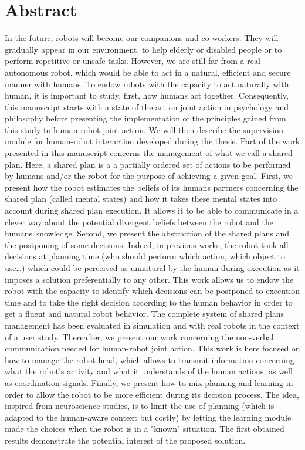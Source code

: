 \documentclass[english,a4paper,11pt,twoside]{StyleThese}
\begin{document}
\dominitoc
\faketableofcontents
\fi


\chapter*{Abstract}

In the future, robots will become our companions and co-workers. They will gradually appear in our environment, to help elderly or disabled people or to perform repetitive or unsafe tasks. However, we are still far from a real autonomous robot, which would be able to act in a natural, efficient and secure manner with humans. 
To endow robots with the capacity to act naturally with human, it is important to study, first, how humans act together. Consequently, this manuscript starts with a state of the art on joint action in psychology and philosophy before presenting the implementation of the principles gained from this study to human-robot joint action. We will then describe the supervision module for human-robot interaction developed during the thesis.
Part of the work presented in this manuscript concerns the management of what we call a shared plan. Here, a shared plan is a a partially ordered set of actions to be performed by humans and/or the robot for the purpose of achieving a given goal. First, we present how the robot estimates the beliefs of its humans partners  concerning the shared plan (called mental states) and how it takes these mental states into account during shared plan execution. It allows it to be able to communicate in a clever way about the potential divergent beliefs between the robot and the humans knowledge. Second, we present the abstraction of the shared plans and the postponing of some decisions. Indeed, in previous works, the robot took all decisions at planning time (who should perform which action, which object to use…) which could be perceived as unnatural by the human during execution as it imposes a solution preferentially to any other. This work allows us to endow the robot with the capacity to identify which decisions can be postponed to execution time and to take the right decision according to the human behavior in order to get a fluent and natural robot behavior. The complete system of shared plans management has been evaluated in simulation  and  with real robots in the context of a user study.
Thereafter, we present our work concerning the non-verbal communication needed for human-robot joint action. This work is here focused on how to manage the robot head, which allows to transmit information concerning what the robot's activity and what it understands of the human actions, as well as coordination signals.
Finally, we present how to mix planning and learning in order to allow the robot to be more efficient during its decision process. The idea, inspired from neuroscience studies, is to limit the use of planning (which is adapted to the human-aware context but costly) by letting the learning module made the choices when the robot is in a "known" situation. The first obtained results demonstrate the potential interest of the proposed solution.
\end{document}
